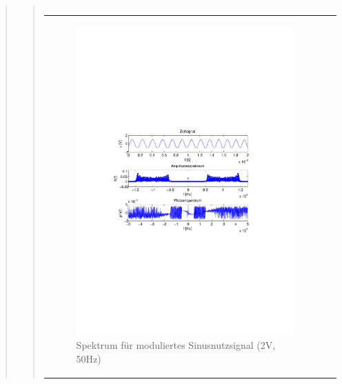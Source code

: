 \begin{quote}
\begin{quote}
\begin{center}
\begin{tabular}{ll}
            \end{tabular}
            \end{center}
        
        
               \begin{center}
            \begin{tabular}{ll}

            \hspace{-10em}
                \begin{minipage}{0.6\textwidth}

                    \begin{figure}[H]
                        \label{fig:}
                        \includegraphics[scale=0.5, trim = 4cm 9.5cm 3.5cm
                        9.5cm, clip]{./Bilder/sin_a2_f50}
                        \caption{Spektrum für moduliertes Sinusnutzsignal (2V,
                        50Hz)}
                    \end{figure}


\end{minipage}
\end{tabular}
\end{center}
\end{quote}
\end{quote}
